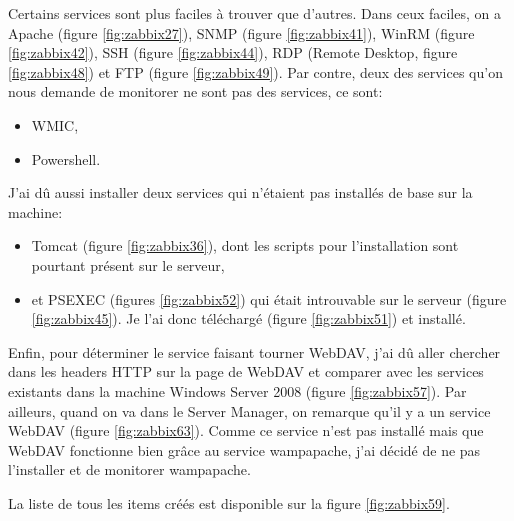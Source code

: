 \documentclass[a4paper]{article}
\begin{document}
Certains services sont plus faciles à trouver que d'autres. Dans ceux faciles, on a Apache (figure \ref{fig:zabbix27}), SNMP (figure \ref{fig:zabbix41}), WinRM (figure \ref{fig:zabbix42}), SSH (figure \ref{fig:zabbix44}), RDP (Remote Desktop, figure \ref{fig:zabbix48}) et FTP (figure \ref{fig:zabbix49}). Par contre, deux des services qu'on nous demande de monitorer ne sont pas des services, ce sont:
\begin{itemize}
    \item WMIC,
    \item Powershell.
\end{itemize}
J'ai dû aussi installer deux services qui n'étaient pas installés de base sur la machine:
\begin{itemize}
    \item Tomcat (figure \ref{fig:zabbix36}), dont les scripts pour l'installation sont pourtant présent sur le serveur,
    \item et PSEXEC (figures \ref{fig:zabbix52}) qui était introuvable sur le serveur (figure \ref{fig:zabbix45}). Je l'ai donc téléchargé (figure \ref{fig:zabbix51}) et installé.
\end{itemize}
Enfin, pour déterminer le service faisant tourner WebDAV, j'ai dû aller chercher dans les headers HTTP sur la page de WebDAV et comparer avec les services existants dans la machine Windows Server 2008 (figure \ref{fig:zabbix57}). Par ailleurs, quand on va dans le Server Manager, on remarque qu'il y a un service WebDAV (figure \ref{fig:zabbix63}). Comme ce service n'est pas installé mais que WebDAV fonctionne bien grâce au service wampapache, j'ai décidé de ne pas l'installer et de monitorer wampapache.

La liste de tous les items créés est disponible sur la figure \ref{fig:zabbix59}.
\end{document}
